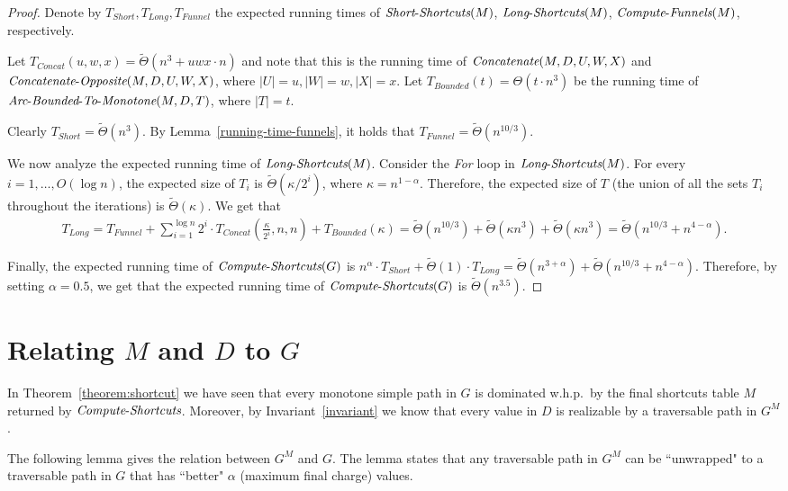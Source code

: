 \documentclass[11pt]{article}
\newcommand{\Concat}{\mbox{{\it Concatenate}}}
\newcommand{\CO}{\mbox{{\it Concatenate}-{\it Opposite}}}
\newcommand{\LS}{\mbox{{\it Long}-{\it Shortcuts}}}
\newcommand{\Simple}{\mbox{{\it Short}-{\it Shortcuts}}}
\newcommand{\ComputeF}{\mbox{{\it Compute}-{\it Funnels}}}
\newcommand{\ComputeS}{\mbox{{\it Compute}-{\it Shortcuts}}}
\newcommand{\Extend}{\mbox{{\it Arc}-{\it Bounded}-{\it To}-{\it Monotone}}}
\begin{document}
\begin{proof}
    Denote by $T_{Short}, T_{Long},T_{Funnel}$ the expected running times of $\Simple(M)$, $\LS(M)$, $\ComputeF(M)$, respectively. 
    
    Let $T_{Concat}(u,w,x) = \tilde{\Theta}(n^3 + uwx\cdot n)$ and note that this is the running time of $\Concat(M,D,U,W,X)$ and $\CO(M,D,U,W,X)$, where $|U|=u, |W|=w, |X|=x$. Let $T_{Bounded}(t) = \Theta(t \cdot n^3)$ be the running time of $\Extend(M,D,T)$, where $|T|=t$.
    
    Clearly $T_{Short} = \tilde{\Theta}(n^{3})$. By Lemma~\ref{running-time-funnels}, it holds that $T_{Funnel} = \tilde{\Theta}(n^{10/3})$.


    We now analyze the expected running time of $\LS(M)$. 
    Consider the \emph{For} loop in $\LS(M)$. For every $i=1,\ldots ,O(\log n)$, the expected size of $T_i$ is $\tilde{\Theta}(\kappa/2^i)$, where $\kappa=n^{1-\alpha}$. Therefore, the expected size of $T$ (the union of all the sets $T_i$ throughout the iterations) is $\tilde{\Theta}(\kappa)$. We get that
    \begin{align*}
        T_{Long} = T_{Funnel} + \sum_{i=1}^{\log n} {2^i \cdot T_{Concat}\left(\frac{\kappa}{2^i},n,n\right)} + T_{Bounded}(\kappa) = \tilde{\Theta}(n^{10/3}) +  \tilde{\Theta}(\kappa n^{3})  + \tilde{\Theta}(\kappa n^{3}) = \tilde{\Theta}(n^{10/3}+n^{4-\alpha}).
    \end{align*}


    Finally, the expected running time of $\ComputeS(G)$ is $n^\alpha \cdot T_{Short} + \tilde{\Theta}(1)\cdot T_{Long} = \tilde{\Theta}(n^{3+\alpha}) + \tilde{\Theta}(n^{10/3}+n^{4-\alpha})$. Therefore, by setting $\alpha = 0.5$, we get that the expected running time of $\ComputeS(G)$ is $\tilde{\Theta}(n^{3.5})$.
\end{proof}


\section{Relating \texorpdfstring{$M$ and $D$}{M and D} to \texorpdfstring{$G$}{G}}\label{S-relating}
In Theorem~\ref{theorem:shortcut} we have seen that every monotone simple path in $G$ is dominated w.h.p.\ by the final shortcuts table $M$ returned by $\ComputeS$. Moreover, by Invariant~\ref{invariant} we know that every value in $D$ is realizable by a traversable path in $G^M$.

The following lemma gives the relation between $G^M$ and $G$. 
The lemma states that any traversable path in $G^M$ can be ``unwrapped" to a traversable path in $G$ that has ``better" $\alpha$ (maximum final charge) values.
\end{document}
